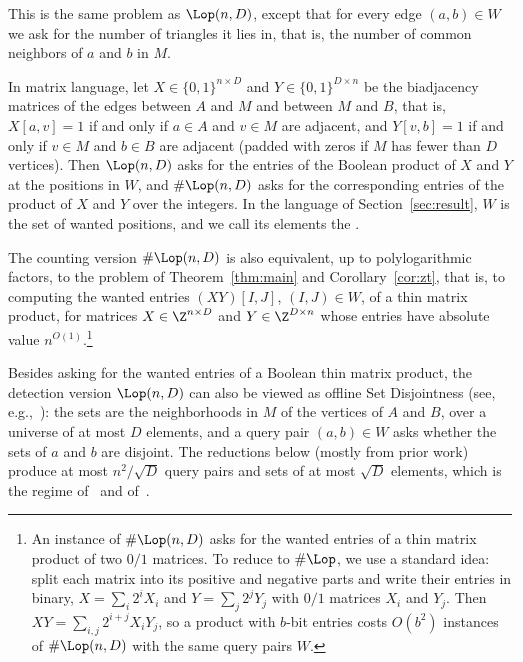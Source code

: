\begin{definition}\label{def:countlop}
This is the same problem as $\Lop(n,D)$, except that for every edge $(a,b)\in W$ we ask for the number of triangles it lies in, that is, the number of common neighbors of $a$ and $b$ in $M$.
\end{definition}

In matrix language, let $X\in\{0,1\}^{n\times D}$ and $Y\in\{0,1\}^{D\times n}$ be the biadjacency matrices of the edges between $A$ and $M$ and between $M$ and $B$, that is, $X[a,v]=1$ if and only if $a\in A$ and $v\in M$ are adjacent, and $Y[v,b]=1$ if and only if $v\in M$ and $b\in B$ are adjacent (padded with zeros if $M$ has fewer than $D$ vertices). Then $\Lop(n,D)$ asks for the entries of the Boolean product of $X$ and $Y$ at the positions in $W$, and $\#\Lop(n,D)$ asks for the corresponding entries of the product of $X$ and $Y$ over the integers. In the language of Section~\ref{sec:result}, $W$ is the set of wanted positions, and we call its elements the .

The counting version $\#\Lop(n,D)$ is also equivalent, up to polylogarithmic factors, to the problem of Theorem~\ref{thm:main} and Corollary~\ref{cor:zt}, that is, to computing the wanted entries $(XY)[I,J]$, $(I,J)\in W$, of a thin matrix product, for matrices $X\in\Z^{n\times D}$ and $Y\in\Z^{D\times n}$ whose entries have absolute value $n^{O(1)}$.\footnote{An instance of $\#\Lop(n,D)$ asks for the wanted entries of a thin matrix product of two $0/1$ matrices. To reduce to $\#\Lop$, we use a standard idea: split each matrix into its positive and negative parts and write their entries in binary, $X=\sum_i2^iX_i$ and $Y=\sum_j2^jY_j$ with $0/1$ matrices $X_i$ and $Y_j$. Then $XY=\sum_{i,j}2^{i+j}X_iY_j$, so a product with $b$-bit entries costs $O(b^2)$ instances of $\#\Lop(n,D)$ with the same query pairs $W$.} 

Besides asking for the wanted entries of a Boolean thin matrix product, the detection version $\Lop(n,D)$ can also be viewed as offline Set Disjointness (see, e.g.,~\cite{KPP16,VX20a}): the sets are the neighborhoods in $M$ of the vertices of $A$ and $B$, over a universe of at most $D$ elements, and a query pair $(a,b)\in W$ asks whether the sets of $a$ and $b$ are disjoint. The reductions below (mostly from prior work) produce at most $n^2/\sqrt D$ query pairs and sets of at most $\sqrt D$ elements, which is the regime of~\cite{KPP16} and of~\cite[Corollary~3.12]{VX20a}.

